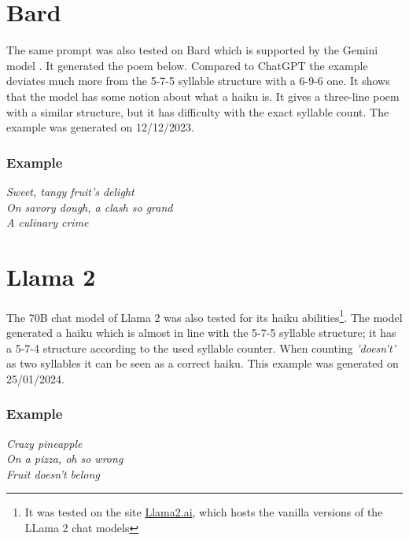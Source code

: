 \section{Bard}
The same prompt was also tested on Bard\cite{googlebard2023} which is supported by the Gemini model \cite{gemini_team_gemini_2023}. It generated the poem below. Compared to ChatGPT the example deviates much more from the 5-7-5 syllable structure with a 6-9-6 one. It shows that the model has some notion about what a haiku is. It gives a three-line poem with a similar structure, but it has difficulty with the exact syllable count. The example was generated on 12/12/2023.

\subsubsection{Example}
\textit{Sweet, tangy fruit's delight\\ 
On savory dough, a clash so grand \\
A culinary crime\\}

\section{Llama 2}
The 70B chat model of Llama 2 \cite{touvron_llama_2023} was also tested for its haiku abilities\footnote{It was tested on the site \href{https://www.llama2.ai/}{Llama2.ai}, which hosts the vanilla versions of the LLama 2 chat models}. The model generated a haiku which is almost in line with the 5-7-5 syllable structure; it has a 5-7-4 structure according to the used syllable counter. When counting \textit{'doesn't'} as two syllables it can be seen as a correct haiku. This example was generated on 25/01/2024.

\subsubsection{Example}
\textit{Crazy pineapple\\ 
On a pizza, oh so wrong \\
Fruit doesn't belong\\}
